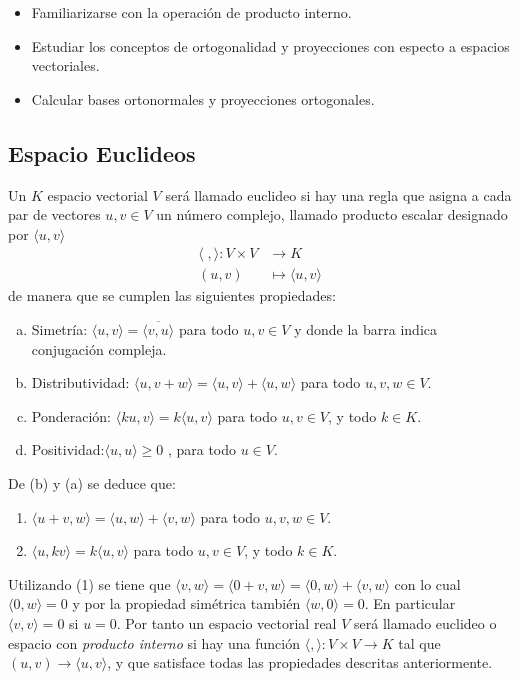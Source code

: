 \begin{itemize}
\item
Familiarizarse con la operación de producto interno. 


\item
Estudiar los conceptos de ortogonalidad y proyecciones con especto a espacios vectoriales.

\item
Calcular bases ortonormales y proyecciones ortogonales.

\end{itemize}





\subsection{Espacio Euclideos}

\begin{defin}
Un $K$ espacio vectorial $V$ será llamado euclideo si hay una regla que asigna a cada par de
vectores $u, v \in V$ un número complejo, llamado producto escalar designado por $\langle u , v\rangle$ 
\begin{align*}
    \langle \; , \rangle : V
\times V &\to K\\
    (u,v)&\mapsto \langle u , v\rangle
\end{align*}
de manera que se cumplen las siguientes propiedades:
\begin{enumerate}[(a)]
\item Simetría: $\langle u , v\rangle=\overline{\langle v , u\rangle}$ para todo $u, v \in V$ y donde la barra indica conjugaci\'on compleja.
\item Distributividad: $\langle u , v+w\rangle=\langle u , v\rangle+\langle u , w\rangle$ para todo $u, v, w \in V$.
\item Ponderación: $\langle ku , v\rangle=k\langle u , v\rangle$ para todo $u, v \in V$, y todo $k \in K$.
\item Positividad:$\langle u , u\rangle\geq 0$ , para todo $u \in V$.
\end{enumerate}
De (b) y (a) se deduce que:
\begin{enumerate}
    \item $\langle u+v , w\rangle=\langle u , w\rangle+\langle v , w\rangle$ para todo $u, v, w \in V$.
    \item $\langle u , kv\rangle=k\langle u , v\rangle$ para todo $u, v \in V$, y todo $k \in K$.
\end{enumerate}
Utilizando (1) se tiene que $\langle v , w\rangle=\langle 0+v , w\rangle=\langle 0 , w\rangle+\langle v , w\rangle$ con lo cual $\langle 0 , w\rangle=0$ y por la propiedad simétrica también $\langle w, 0\rangle=0$. En particular $\langle v , v\rangle=0$ si $u= 0$.
Por tanto un espacio vectorial real $V$ será llamado euclideo o espacio con \emph{producto interno}
si hay una función $\langle , \rangle: V \times V \to K$ tal que $(u, v) \to \langle u , v\rangle$, y que satisface
todas las propiedades descritas anteriormente.

\end{defin}

